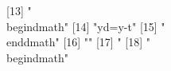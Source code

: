  [13] "\\begin{dmath}"                                                                                                                                                                                                                                                                                                                                                                                                                                                                              
 [14] "{yd}={y}-{t}"                                                                                                                                                                                                                                                                                                                                                                                                                                                                                
 [15] "\\end{dmath}"                                                                                                                                                                                                                                                                                                                                                                                                                                                                                
 [16] ""                                                                                                                                                                                                                                                                                                                                                                                                                                                                                            
 [17] "%
 [18] "\\begin{dmath}"                                                                                                                                                                                                                                                                                                                                                                                                                                                                              
